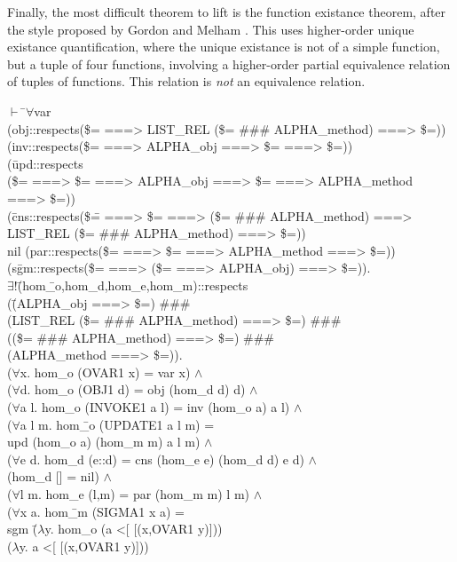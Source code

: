 \documentclass[envcountsame,runningheads]{llncs}
\newcommand{\quotient}{partial equivalence}
\begin{document}
Finally, the most difficult theorem to lift is the function existance
theorem, after the style proposed by Gordon and Melham \cite{GoMe96}.
This uses higher-order unique existance quantification,
where the unique existance is not of a simple function,
but a tuple of four functions, involving a higher-order
\quotient{} relation of tuples of functions.  This relation is {\it not\/}
an equivalence relation.
{\tt \begin{tabbing}
$\vdash$ \=$\forall$var \\
\> (obj::respects(\$= ===> LIST\_REL (\$= \#\#\# ALPHA\_method) ===> \$=)) \\
\> (inv::respects(\$= ===> ALPHA\_obj ===> \$= ===> \$=)) \\
\> (\=upd::respects \\
\>\>(\$= ===> \$= ===> ALPHA\_obj ===> \$= ===> ALPHA\_method ===> \$=)) \\
\> (\=cns::respects(\$\= = ===> \$= ===> (\$= \#\#\# ALPHA\_method) ===> \\
\>\>\>             LIST\_REL (\$= \#\#\# ALPHA\_method) ===> \$=)) \\
\>\>nil (par::respects(\$= ===> \$= ===> ALPHA\_method ===> \$=)) \\
\> (s\=gm::respects(\$= ===> (\$= ===> ALPHA\_obj) ===> \$=)). \\
\>\> $\exists !$\=(hom\=\_o,hom\_d,hom\_e,hom\_m)::respects \\
\>\>\>\>   (\=(ALPHA\_obj ===> \$=) \#\#\# \\
\>\>\>\>\>  (LIST\_REL (\$= \#\#\# ALPHA\_method) ===> \$=) \#\#\# \\
\>\>\>\>\>  ((\$= \#\#\# ALPHA\_method) ===> \$=) \#\#\# \\
\>\>\>\>\>  (ALPHA\_method ===> \$=)). \\
\>\>\>($\forall$x. hom\_o (OVAR1 x) = var x) $\wedge$ \\
\>\>\>($\forall$d. hom\_o (OBJ1 d) = obj (hom\_d d) d) $\wedge$ \\
\>\>\>($\forall$a l. hom\_o (INVOKE1 a l) = inv (hom\_o a) a l) $\wedge$ \\
\>\>\>($\forall$a l m. hom\=\_o (UPDATE1 a l m) = \\
\>\>\>\>          upd (hom\_o a) (hom\_m m) a l m) $\wedge$ \\
\>\>\>($\forall$e d. hom\_d (e::d) = cns (hom\_e e) (hom\_d d) e d) $\wedge$ \\
\>\>\>(hom\_d [] = nil) $\wedge$ \\
\>\>\>($\forall$l m. hom\_e (l,m) = par (hom\_m m) l m) $\wedge$ \\
\>\>\>($\forall$x a. hom\=\_m (SIGMA1 x a) = \\
\>\>\>\>        sgm \=($\lambda$y. hom\_o (a <[ [(x,OVAR1 y)])) \\
\>\>\>\>\>          ($\lambda$y. a <[ [(x,OVAR1 y)]))
\end{tabbing}}
\end{document}
